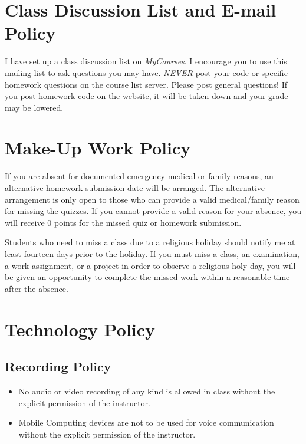 \documentclass[11pt,]{article}
\providecommand{\tightlist}{%
  \setlength{\itemsep}{0pt}\setlength{\parskip}{0pt}}
\begin{document}
\section{Class Discussion List and E-mail
Policy}\label{class-discussion-list-and-e-mail-policy}

I have set up a class discussion list on \emph{MyCourses}. I encourage
you to use this mailing list to ask questions you may have. \emph{NEVER}
post your code or specific homework questions on the course list server.
Please post general questions! If you post homework code on the website,
it will be taken down and your grade may be lowered.

\section{Make-Up Work Policy}\label{make-up-work-policy}

If you are absent for documented emergency medical or family reasons, an
alternative homework submission date will be arranged. The alternative
arrangement is only open to those who can provide a valid medical/family
reason for missing the quizzes. If you cannot provide a valid reason for
your absence, you will receive 0 points for the missed quiz or homework
submission.

Students who need to miss a class due to a religious holiday should
notify me at least fourteen days prior to the holiday. If you must miss
a class, an examination, a work assignment, or a project in order to
observe a religious holy day, you will be given an opportunity to
complete the missed work within a reasonable time after the absence.

\section{Technology Policy}\label{technology-policy}

\subsection{Recording Policy}\label{recording-policy}

\begin{itemize}
\tightlist
\item
  No audio or video recording of any kind is allowed in class without
  the explicit permission of the instructor.
\item
  Mobile Computing devices are not to be used for voice communication
  without the explicit permission of the instructor.
\end{itemize}
\end{document}

